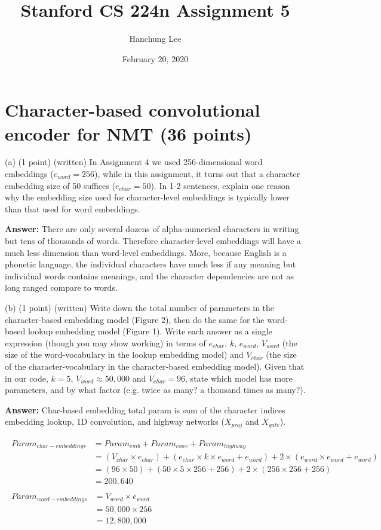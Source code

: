 \documentclass{article}
\title{Stanford CS 224n Assignment 5}
\author{Hanchung Lee}
\date{February 20, 2020}
\begin{document}
\maketitle
\section{Character-based convolutional encoder for NMT (36 points)}
\bigbreak
(a) (1 point) (written) In  Assignment 4 we used 256-dimensional word embeddings ($e_{word} =  256$), while in this assignment, it turns out that a character embedding size of 50 suffices ($e_{char} = 50$). In 1-2 sentences, explain one reason why the embedding size used for character-level embeddings is typically lower than that used for word embeddings.

\bigbreak
\noindent
\textbf{Answer:} There are only several dozens of alpha-numerical characters in writing but tens of thousands of words. Therefore character-level embeddings will have a much less dimension than word-level embeddings. More, because English is a phonetic language, the individual characters have much less if any meaning but individual words contains meanings, and the character dependencies are not as long ranged compare to words.

\bigbreak
\noindent
(b) (1 point) (written) Write down the total number of parameters in the character-based embedding model (Figure 2), then do the same for the word-based lookup embedding model (Figure 1).  Write each answer as a single expression (though you may show working) in terms of $e_{char}$, $k$, $e_{word}$, $V_{word}$ (the size of the word-vocabulary in the lookup embedding model) and $V_{char}$ (the size of the character-vocabulary in the character-based embedding model). Given that in our code, $k = 5$, $V_{word} \approx 50,000$ and $V_{char} = 96$, state which model has more parameters, and by what factor (e.g. twice as many? a thousand times as many?).

\bigbreak
\noindent
\textbf{Answer:} Char-based embedding total param is sum of the character indices embedding lookup, 1D convolution, and highway networks ($X_{proj}$ and $X_{gate}$).

\begin{align*}
\begin{split}
Param_{char-embeddings} &= Param_{emb} + Param_{conv} + Param_{highway} \\
&=(V_{char} \times e_{char}) + (e_{char} \times k \times e_{word} + e_{word}) + 2 \times(e_{word} \times e_{word} + e_{word})\\
&=(96 \times 50) + (50 \times 5 \times 256 + 256) + 2 \times(256 \times 256 + 256)\\
&=200,640
\end{split}\\
\begin{split}
Param_{word-embeddings} &= V_{word} \times e_{word}\\
&=50,000 \times 256\\
&=12,800,000
\end{split}
\end{align*}
\end{document}
